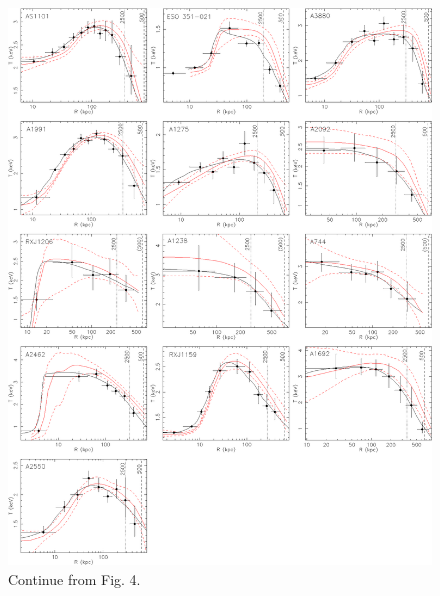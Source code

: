 \documentclass{aastex}
\begin{document}
\begin{figure}
\centerline{\includegraphics[height=1.25\linewidth]{f5.eps}}
  \caption{Continue from Fig. 4.
}
\end{figure}
\clearpage 
\end{document}
